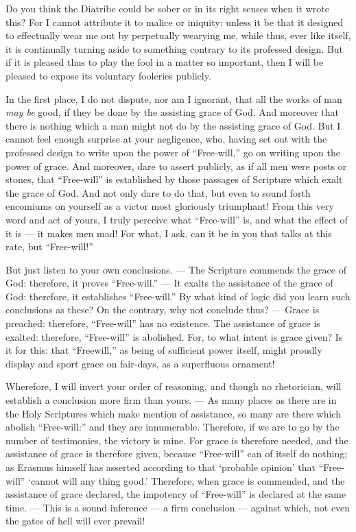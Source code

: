 Do you think the Diatribe could be sober or in its right senses when it wrote this? For I cannot attribute it to malice or iniquity: unless it be that it designed to effectually wear me out by perpetually wearying me, while thus, ever like itself, it is continually turning aside to something contrary to its professed design. But if it is pleased thus to play the fool in a matter so important, then I will be pleased to expose its voluntary fooleries publicly.

In the first place, I do not dispute, nor am I ignorant, that all the works of man \emph{may be }good, if they be done by the assisting grace of God. And moreover that there is nothing which a man might not do by the assisting grace of God. But I cannot feel enough surprise at your negligence, who, having set out with the professed design to write upon the power of “Free-will,” go on writing upon the power of grace. And moreover, dare to assert publicly, as if all men were posts or stones, that “Free-will” is established by those passages of Scripture which exalt the grace of God. And not only dare to do that, but even to sound forth encomiums on yourself as a victor most gloriously triumphant! From this very word and act of yours, I truly perceive what “Free-will” is, and what the effect of it is — it makes men mad! For what, I ask, can it be in you that talks at this rate, but “Free-will!”

But just listen to your own conclusions. — The Scripture commends the grace of God: therefore, it proves “Free-will.” — It exalts the assistance of the grace of God: therefore, it establishes “Free-will.” By what kind of logic did you learn such conclusions as these? On the contrary, why not conclude thus? — Grace is preached: therefore, “Free-will” has no existence. The assistance of grace is exalted: therefore, “Free-will” is abolished. For, to what intent is grace given? Is it for this: that “Freewill,” as being of sufficient power itself, might proudly display and sport grace on fair-days, as a superfluous ornament!

Wherefore, I will invert your order of reasoning, and though no rhetorician, will establish a conclusion more firm than yours. — As many places as there are in the Holy Scriptures which make mention of assistance, so many are there which abolish “Free-will:” and they are innumerable. Therefore, if we are to go by the number of testimonies, the victory is mine. For grace is therefore needed, and the assistance of grace is therefore given, because “Free-will” can of itself do nothing; as Erasmus himself has asserted according to that ‘probable opinion’ that “Free-will” ‘cannot will any thing good.’ Therefore, when grace is commended, and the assistance of grace declared, the impotency of “Free-will” is declared at the same time. — This is a sound inference — a firm conclusion — against which, not even the gates of hell will ever prevail!

